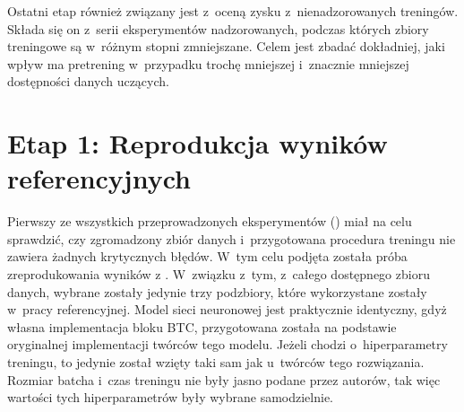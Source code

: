 Ostatni etap również związany jest z~oceną zysku z~nienadzorowanych treningów. Składa się on z~serii eksperymentów nadzorowanych, podczas których zbiory treningowe są w~różnym stopni zmniejszane. Celem jest zbadać dokładniej, jaki wpływ ma pretrening w~przypadku trochę mniejszej i~znacznie mniejszej dostępności danych uczących.



\section{Etap 1: Reprodukcja wyników referencyjnych}

Pierwszy ze wszystkich przeprowadzonych eksperymentów () miał na celu sprawdzić, czy zgromadzony zbiór danych i~przygotowana procedura treningu nie zawiera żadnych krytycznych błędów. W~tym celu podjęta została próba zreprodukowania wyników z \cite{park_bi-directional_2019}. W~związku z~tym, z~całego dostępnego zbioru danych, wybrane zostały jedynie trzy podzbiory, które wykorzystane zostały w~pracy referencyjnej. Model sieci neuronowej jest praktycznie identyczny, gdyż własna implementacja bloku BTC, przygotowana została na podstawie oryginalnej implementacji twórców tego modelu. Jeżeli chodzi o~hiperparametry treningu, to jedynie  został wzięty taki sam jak u~twórców tego rozwiązania. Rozmiar batcha i~czas treningu nie były jasno podane przez autorów, tak więc wartości tych hiperparametrów były wybrane samodzielnie.

